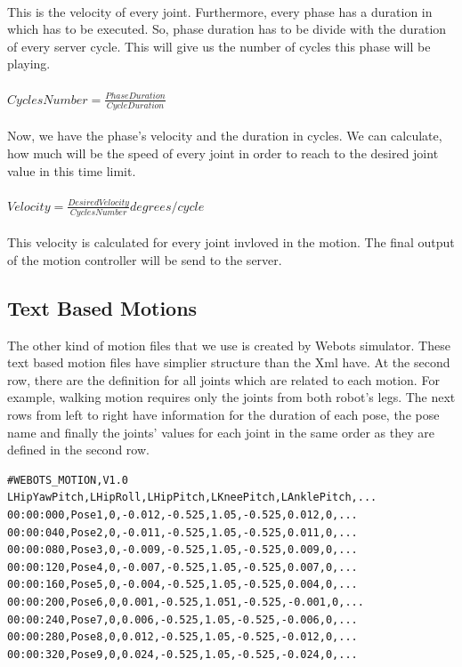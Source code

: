 \\
This is the velocity of every joint. Furthermore, every phase has a duration in which has to be executed. So, phase duration has to be divide with the duration of every server cycle. This will give us the number of cycles this phase will be playing.\\
\\
$Cycles Number = \frac {Phase Duration} {Cycle Duration}$\\
\\
Now, we have the phase's velocity and the duration in cycles. We can calculate, how much will be the speed of every joint in order to reach to the desired joint value in this time limit.\\
\\
$Velocity = \frac {Desired Velocity} {Cycles Number} degrees/cycle$\\
\\
This velocity is calculated for every joint invloved in the motion. The final output of the motion controller will be send to the server.



\subsection{Text Based Motions}
The other kind of motion files that we use is created by Webots simulator. These text based motion files have simplier structure than the Xml have. At the second row, there are the definition for all joints which are related to  each motion. For example, walking motion requires only the joints from both robot's legs. The next rows from left to right have information for the duration of each pose, the pose name and finally the joints' values for each joint in the same order as they are defined in the second row.
\begin{verbatim}
#WEBOTS_MOTION,V1.0
LHipYawPitch,LHipRoll,LHipPitch,LKneePitch,LAnklePitch,...
00:00:000,Pose1,0,-0.012,-0.525,1.05,-0.525,0.012,0,...
00:00:040,Pose2,0,-0.011,-0.525,1.05,-0.525,0.011,0,...
00:00:080,Pose3,0,-0.009,-0.525,1.05,-0.525,0.009,0,...
00:00:120,Pose4,0,-0.007,-0.525,1.05,-0.525,0.007,0,...
00:00:160,Pose5,0,-0.004,-0.525,1.05,-0.525,0.004,0,...
00:00:200,Pose6,0,0.001,-0.525,1.051,-0.525,-0.001,0,...
00:00:240,Pose7,0,0.006,-0.525,1.05,-0.525,-0.006,0,...
00:00:280,Pose8,0,0.012,-0.525,1.05,-0.525,-0.012,0,...
00:00:320,Pose9,0,0.024,-0.525,1.05,-0.525,-0.024,0,...
\end{verbatim}
